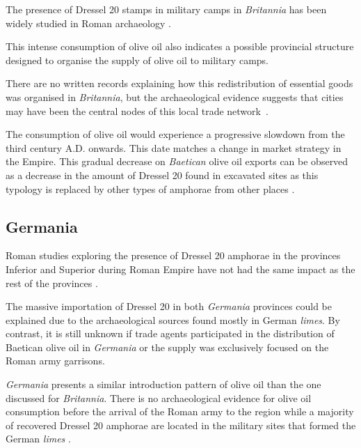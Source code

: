 The presence of Dressel 20 stamps in military camps in \textit{Britannia} has been widely studied in Roman archaeology \citep{williams_importation_1983,
funari_corpus_1996,
carreras_britannia_1998,carreras_abastecimiento_2003}.

This intense consumption of olive oil also indicates a possible provincial structure designed to organise the supply of olive oil to military camps. 

There are no written records explaining how this redistribution of essential goods was organised in \textit{Britannia}, but the archaeological evidence suggests that cities may have been the central nodes of this local trade network~\citep{funari_economic_2005,orengo_seeds_2016}. 

The consumption of olive oil would experience a progressive slowdown from the third century A.D. onwards. This date matches a change in market strategy in the Empire. This gradual decrease on \textit{Baetican} olive oil exports can be observed as a decrease in the amount of Dressel 20 found in excavated sites as this typology is replaced by other types of amphorae from other places \citep{rodriguez1991aceite,millet_anforas_1998}.


\subsection{Germania}
\label{sec:4}

Roman studies exploring the presence of Dressel 20 amphorae in the provinces Inferior and Superior during Roman Empire have not had the same impact as the rest of the provinces \citep[293]{remesal_baetica_2002}.

The massive importation of Dressel 20 in both \textit{Germania} provinces could be explained due to the archaeological sources found mostly in German \textit{limes}. 
By contrast, it is still unknown if trade agents participated in the distribution of Baetican olive oil in \textit{Germania} or the supply was exclusively focused on the Roman army garrisons\citep[156]{remesal_germn_2010}.


\textit{Germania} presents a similar introduction pattern of olive oil than the one discussed for \textit{Britannia}. There is no archaeological evidence for olive oil consumption before the arrival of the Roman army to the region while a majority of recovered Dressel 20 amphorae are located in the military sites that formed the German \textit{limes} \citep{remesal_germaniaengl_2002}.

